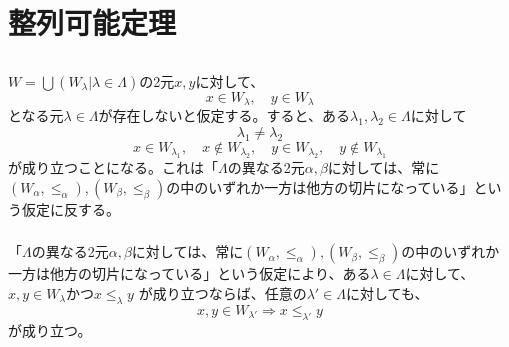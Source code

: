 \documentclass{jsarticle}
\begin{document}
\section{整列可能定理}
\subsection{}
\subsubsection{}
\label{11_1_1}
$W=\bigcup(W_\lambda|\lambda\in\Lambda)$の2元$x,y$に対して、
\[x\in W_\lambda,\quad y\in W_\lambda\]
となる元$\lambda\in\Lambda$が存在しないと仮定する。すると、ある$\lambda_1,\lambda_2\in\Lambda$に対して
\[\lambda_1\neq\lambda_2\]
\[x\in W_{\lambda_1},\quad x\notin W_{\lambda_2},\quad y\in W_{\lambda_2},\quad y\notin W_{\lambda_1}\]
が成り立つことになる。これは「$\Lambda$の異なる2元$\alpha,\beta$に対しては、常に$(W_\alpha,\leq_\alpha),(W_\beta,\leq_\beta)$の中のいずれか一方は他方の切片になっている」という仮定に反する。

\subsubsection{}
\label{11_1_2}
「$\Lambda$の異なる2元$\alpha,\beta$に対しては、常に$(W_\alpha,\leq_\alpha),(W_\beta,\leq_\beta)$の中のいずれか一方は他方の切片になっている」という仮定により、ある$\lambda\in\Lambda$に対して、
$x,y\in W_\lambda かつ x\leq_\lambda y$
が成り立つならば、任意の$\lambda'\in\Lambda$に対しても、
\[x,y\in W_{\lambda'}\Longrightarrow x\leq_{\lambda'}y\]
が成り立つ。
\end{document}
